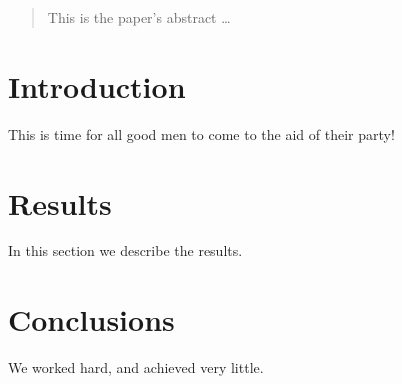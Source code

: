 \documentclass[12pt]{article}
\begin{document}
\maketitle

\begin{abstract}
This is the paper's abstract \ldots
\end{abstract}

\section{Introduction}
This is time for all good men to come to the aid of their party!

\section{Results}
In this section we describe the results.

\section{Conclusions}
We worked hard, and achieved very little.
\end{document}
